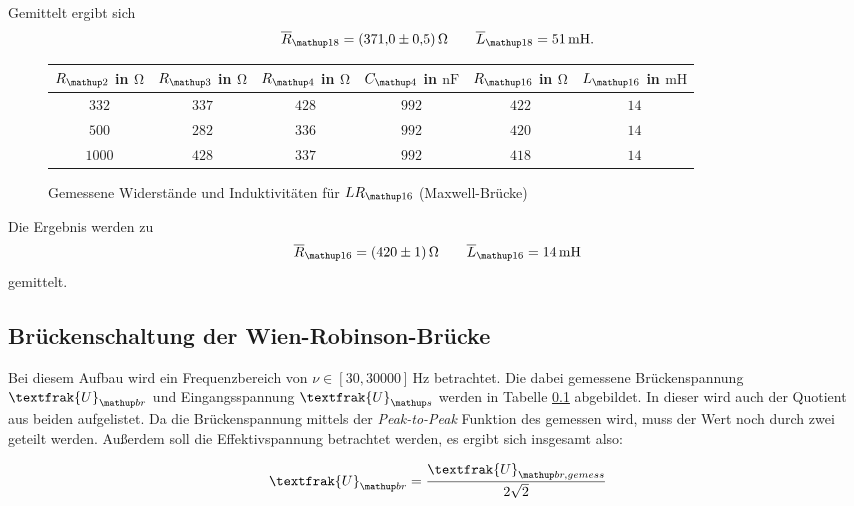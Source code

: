Gemittelt ergibt sich
\begin{equation}
\label{eq:wert_lr_16_max}
\overline{R}_{\map{18}}=\SI{371\pm0.5}{\ohm} \qquad \overline{L}_{\map{18}}=\SI{51}{\milli\henry}.
\end{equation}


\begin{figure}
\centering
\caption{Gemessene Widerstände und Induktivitäten für $LR\ua{16}$ (Maxwell-Brücke)}
  \label{tab:lc_r16_max}
\begin{tabular}{S S S S S S }
    \toprule
    {$R\ua{2}$  in $\si{\ohm}$} &  {$R\ua{3}$ in $\si{\ohm}$} & {$R\ua{4}$ in $\si{\ohm}$} & {$C\ua{4}$ in $\si{\nano\farad}$}& {$R\ua{16}$ in $\si{\ohm}$} &  {$L\ua{16}$ in $\si{\milli\henry}$} \\
    \midrule
     {$\num{332}$} & {$\num{337}$} &  {$\num{428}$}& {$\num{992}$}  &  {$\num{422}$} & {$\num{14}$}\\
     {$\num{500}$} & {$\num{282}$}  & {$\num{336}$} & {$\num{992}$} & {$\num{420}$} & {$\num{14}$}\\
     {$\num{1000}$} & {$\num{428}$}  & {$\num{337}$} & {$\num{992}$} &{$\num{418}$} & {$\num{14}$}  \\
    \bottomrule
  \end{tabular}
 \end{figure}


Die Ergebnis werden zu 
\begin{equation}
\label{eq:wert_lr_16_max}
\overline{R}_{\map{16}}=\SI{420\pm1}{\ohm} \qquad \overline{L}_{\map{16}}=\SI{14}{\milli\henry}
\end{equation}
gemittelt.

\subsection{Brückenschaltung der Wien-Robinson-Brücke}

Bei diesem Aufbau wird ein Frequenzbereich von $\nu\in\left[30,30000\right]\,\si{\hertz}$ betrachtet.
Die dabei gemessene Brückenspannung $\textfrak{U}\ua{br}$ und Eingangsspannung $\textfrak{U}\ua{s}$ werden in Tabelle \ref{} abgebildet.
In dieser wird auch der Quotient aus beiden aufgelistet.
Da die Brückenspannung mittels der \emph{Peak-to-Peak} Funktion des gemessen wird, 
muss der Wert noch durch zwei geteilt werden. Außerdem soll die Effektivspannung betrachtet werden, es ergibt sich insgesamt also:


\begin{equation*}
\textfrak{U}\ua{br}=\frac{\textfrak{U}\ua{br,gemess}}{2\sqrt{2}}
\end{equation*}


